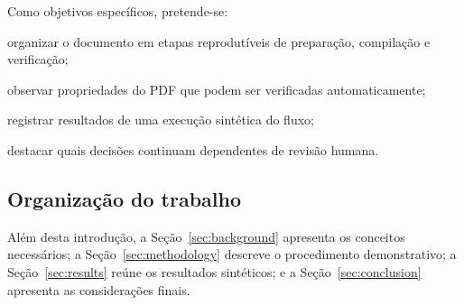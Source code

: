 Como objetivos específicos, pretende-se:

\begin{ufclettereditems}
  \item organizar o documento em etapas reprodutíveis de preparação, compilação e verificação;
  \item observar propriedades do PDF que podem ser verificadas automaticamente;
  \item registrar resultados de uma execução sintética do fluxo;
  \item destacar quais decisões continuam dependentes de revisão humana.
\end{ufclettereditems}

\subsection{Organização do trabalho}

Além desta introdução, a Seção~\ref{sec:background} apresenta os conceitos necessários; a Seção~\ref{sec:methodology} descreve o procedimento demonstrativo; a Seção~\ref{sec:results} reúne os resultados sintéticos; e a Seção~\ref{sec:conclusion} apresenta as considerações finais.
